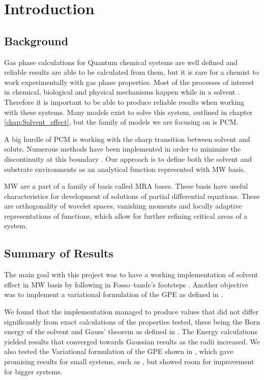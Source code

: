\documentclass[../master_thesis.tex]{subfiles}
\begin{document}
\chapter{Introduction}
\section{Background}
Gas phase calculations for Quantum chemical systems are well defined and
reliable results are able to be calculated from them, but it is rare for a chemist
to work experimentally with gas phase properties. Most of the processes of interest
in chemical, biological and physical mechanisms happen while in a solvent \cite{FossoTande:2013ka}.
Therefore it is important to be able to produce reliable results when working
with these systems. Many models exist to solve this system, outlined in chapter
\ref{chap:Solvent_effect}, but the family of models we are focusing on is \ac{PCM}.

A big hurdle of \ac{PCM} is working with the sharp transition between solvent and
solute. Numerous methods have been implemented in order to minimize the discontinuity
at this boundary \cite{Tomasi:2005ipa}. Our approach is to define both the solvent
and substrate environments as an analytical function represented with \ac{MW} basis.

\ac{MW} are a part of a family of basis called \ac{MRA} bases. These basis have useful
characteristics for development of solutions of partial differential equations.
These are orthogonality of wavelet spaces, vanishing moments and locally adaptive
representations of functions, which allow for further refining critical areas of a system.

\section{Summary of Results}
The main goal with this project was to have a working implementation of solvent
effect in \ac{MW} basis by following in Fosso--tande's footsteps \cite{FossoTande:2013ka}.
Another objective was to implement a variational formulation of the \ac{GPE}
as defined in \cite{Lipparini:2010bg}.

We found that the implementation managed to produce values that did not differ
significantly from exact calculations of the properties tested, these being the Born energy of
the solvent \cite{Tomasi:1994wt} and Gauss' theorem as defined in \cite{Sorland}.
The Energy calculations yielded results that converged towards Gaussian results
as the radii increased. We also tested the Variational formulation of the
\ac{GPE} shown in \cite{Lipparini:2010bg}, which gave promising results for
small systems, such as , but showed room for improvement for bigger systems.
\end{document}

